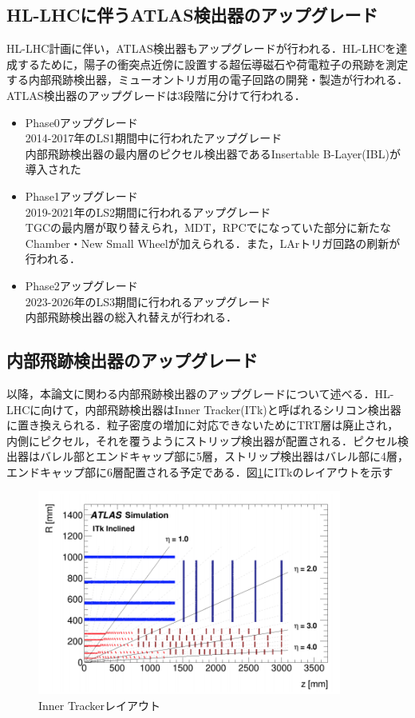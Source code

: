 \subsection{HL-LHCに伴うATLAS検出器のアップグレード}
HL-LHC計画に伴い，ATLAS検出器もアップグレードが行われる．HL-LHCを達成するために，陽子の衝突点近傍に設置する超伝導磁石や荷電粒子の飛跡を測定する内部飛跡検出器，ミューオントリガ用の電子回路の開発・製造が行われる．ATLAS検出器のアップグレードは3段階に分けて行われる．

\begin{itemize}
\item Phase0アップグレード\\
2014-2017年のLS1期間中に行われたアップグレード\\
内部飛跡検出器の最内層のピクセル検出器であるInsertable B-Layer(IBL)が導入された
\item Phase1アップグレード\\
2019-2021年のLS2期間に行われるアップグレード\\
TGCの最内層が取り替えられ，MDT，RPCでになっていた部分に新たなChamber・New Small Wheelが加えられる．また，LArトリガ回路の刷新が行われる．
\item Phase2アップグレード\\
2023-2026年のLS3期間に行われるアップグレード\\
内部飛跡検出器の総入れ替えが行われる．
\end{itemize}

\subsection{内部飛跡検出器のアップグレード}
以降，本論文に関わる内部飛跡検出器のアップグレードについて述べる．HL-LHCに向けて，内部飛跡検出器はInner Tracker(ITk)と呼ばれるシリコン検出器に置き換えられる．粒子密度の増加に対応できないためにTRT層は廃止され，内側にピクセル，それを覆うようにストリップ検出器が配置される．ピクセル検出器はバレル部とエンドキャップ部に5層，ストリップ検出器はバレル部に4層，エンドキャップ部に6層配置される予定である．図\ref{fig:ITkview}にITkのレイアウトを示す\par

\begin{figure}[h]
  \centering
  \includegraphics[width=10cm]{./figure/ITkview.png}
  \caption{Inner Trackerレイアウト\cite{Collaboration:2285585}}
  \label{fig:ITkview}
\end{figure}


